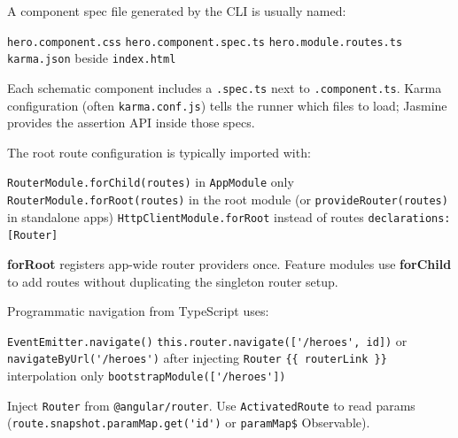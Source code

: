 \question[4]
A component spec file generated by the CLI is usually named:
\begin{choices}
  \choice \texttt{hero.component.css}
  \CorrectChoice \texttt{hero.component.spec.ts}
  \choice \texttt{hero.module.routes.ts}
  \choice \texttt{karma.json} beside \texttt{index.html}
\end{choices}
\begin{solution}
  Each schematic component includes a \texttt{.spec.ts} next to \texttt{.component.ts}. Karma configuration (often \texttt{karma.conf.js}) tells the runner which files to load; Jasmine provides the assertion API inside those specs.
\end{solution}

\question[4]
The root route configuration is typically imported with:
\begin{choices}
  \choice \lstinline[style=tsinline]|RouterModule.forChild(routes)| in \texttt{AppModule} only
  \CorrectChoice \lstinline[style=tsinline]|RouterModule.forRoot(routes)| in the root module (or \lstinline[style=tsinline]|provideRouter(routes)| in standalone apps)
  \choice \lstinline[style=tsinline]|HttpClientModule.forRoot| instead of routes
  \choice \texttt{declarations: [Router]}
\end{choices}
\begin{solution}
  \textbf{forRoot} registers app-wide router providers once. Feature modules use \textbf{forChild} to add routes without duplicating the singleton router setup.
\end{solution}

\question[4]
Programmatic navigation from TypeScript uses:
\begin{choices}
  \choice \lstinline[style=tsinline]|EventEmitter.navigate()|
  \CorrectChoice \lstinline[style=tsinline]|this.router.navigate(['/heroes', id])| or \lstinline[style=tsinline]|navigateByUrl('/heroes')| after injecting \lstinline[style=tsinline]|Router|
  \choice \lstinline[style=htmlinline]|{{ routerLink }}| interpolation only
  \choice \lstinline[style=tsinline]|bootstrapModule(['/heroes'])|
\end{choices}
\begin{solution}
  Inject \lstinline[style=tsinline]|Router| from \lstinline[style=tsinline]|@angular/router|. Use \lstinline[style=tsinline]|ActivatedRoute| to read params (\lstinline[style=tsinline]|route.snapshot.paramMap.get('id')| or \lstinline[style=tsinline]|paramMap$| Observable).
\end{solution}

